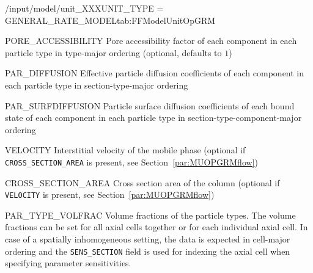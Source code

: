 \begin{condsubgroup}{/input/model/unit\_XXX}{UNIT\_TYPE = GENERAL\_RATE\_MODEL}{tab:FFModelUnitOpGRM}
\begin{dataset}
  \end{dataset}
  \begin{dataset}[unit=--,type=double,range={$(0, 1]$},length={$\texttt{NPARTYPE} \cdot \texttt{NCOMP}$}]{PORE\_ACCESSIBILITY}
    Pore accessibility factor of each component in each particle type in type-major ordering (optional, defaults to $1$)
  \end{dataset}
  \begin{dataset}[unit=\si{\square\metre\of{MP}\per\second},type=double,range={$\geq 0$},length={$\texttt{NPARTYPE} \cdot \texttt{NCOMP}$ / $\texttt{NSEC} \cdot \texttt{NPARTYPE} \cdot \texttt{NCOMP}$}]{PAR\_DIFFUSION}
    Effective particle diffusion coefficients of each component in each particle type in section-type-major ordering
  \end{dataset}
  \begin{dataset}[unit=\si{\square\metre\of{SP}\per\second},type=double,range={$\geq 0$},length={$\texttt{NTOTALBND}$ / $\texttt{NSEC} \cdot \texttt{NTOTALBND}$}]{PAR\_SURFDIFFUSION}
    Particle surface diffusion coefficients of each bound state of each component in each particle type in section-type-component-major ordering
  \end{dataset}
  \begin{dataset}[unit=\si{\metre\per\second},type=double,range={$\mathds{R}$},length={1 / \texttt{NSEC}}]{VELOCITY}
    Interstitial velocity of the mobile phase (optional if \texttt{CROSS\_SECTION\_AREA} is present, see Section~\ref{par:MUOPGRMflow})
  \end{dataset}
  \begin{dataset}[unit=\si{\square\metre},type=double,range={$>0$},length={1}]{CROSS\_SECTION\_AREA}
    Cross section area of the column (optional if \texttt{VELOCITY} is present, see Section~\ref{par:MUOPGRMflow})
  \end{dataset}
  \begin{dataset}[unit=--,type=double,range={$[0,1]$},length={\texttt{NPARTYPE} / $\texttt{NCOL} \cdot \texttt{NPARTYPE}$}]{PAR\_TYPE\_VOLFRAC}
    Volume fractions of the particle types.
    The volume fractions can be set for all axial cells together or for each individual axial cell.
    In case of a spatially inhomogeneous setting, the data is expected in cell-major ordering and the \texttt{SENS\_SECTION} field is used for indexing the axial cell when specifying parameter sensitivities.
  \end{dataset}
\end{condsubgroup}


